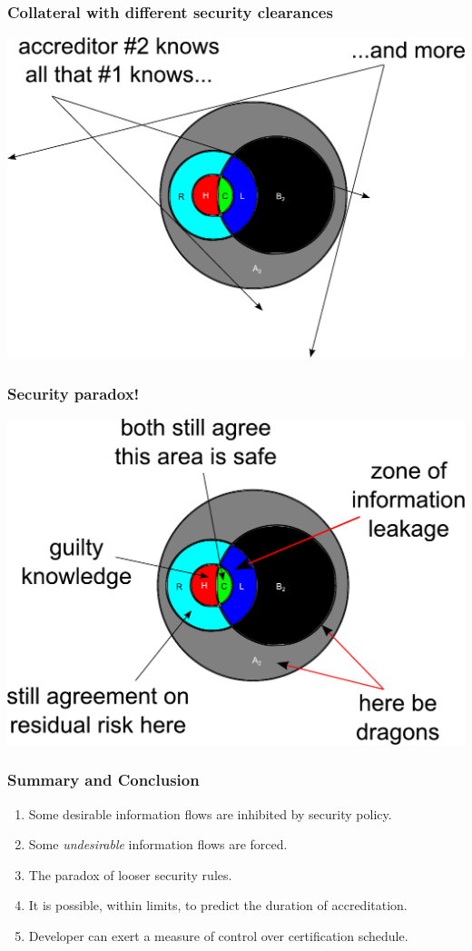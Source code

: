 \documentclass{beamer}
\begin{document}
\begin{frame}
	\frametitle{Collateral with different security clearances}
	\begin{center}
		\includegraphics[width=\textwidth]{venn_diagrams_for_slides_8.pdf}
	\end{center}
\end{frame}

\begin{frame}
	\frametitle{Security paradox!}
	\begin{center}
		\includegraphics[width=\textwidth]{venn_diagrams_for_slides_9.pdf}
	\end{center}
\end{frame}

\begin{frame}
	\frametitle{Summary and Conclusion}
	\begin{enumerate}
		\item Some desirable information flows are inhibited by security policy.
		\item Some \emph{undesirable} information flows are forced.
		\item The paradox of looser security rules.
		\item It is possible, within limits, to predict the duration of accreditation.
		\item Developer can exert a measure of control over certification schedule.
	\end{enumerate}
\end{frame}
\end{document}
